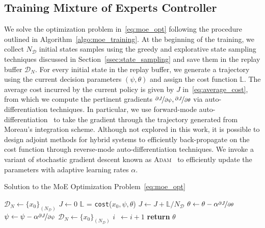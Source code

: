 \subsection{Training Mixture of Experts Controller}
\label{ssec:training_moe}

%
We solve the optimization problem in~\eqref{eq:moe_opt} following the procedure
outlined in Algorithm~\eqref{algo:moe_training}.
%
At the beginning of the training, we collect $N_{\mathcal{D}}$ initial states
samples using the greedy and explorative state sampling techniques discussed in
Section~\ref{ssec:state_sampling} and save them in the replay buffer $\mathcal{D}_N$.
%
For every initial state in the replay buffer, we generate a trajectory using the
current decision parameters $(\psi, \theta)$ and assign the cost function
$\mathbb{L}$.
%
The average cost incurred by the current policy is given by $J$
in~\eqref{eq:average_cost}, from which we compute the pertinent gradients
$\nicefrac{\partial J}{\partial \psi}, \nicefrac{\partial J}{\partial \theta}$
via auto-differentiation techniques.
%
In particular, we use forward-mode auto-differentiation~\cite{revels2016forward}
to take the gradient through the trajectory generated from Moreau's integration
scheme.
%
Although not explored in this work, it is possible to design adjoint methods for
hybrid systems to efficiently back-propagate on the cost function through
reverse-mode auto-differentiation techniques.
%
We invoke a variant of stochastic gradient descent known as
\textsc{Adam}~\cite{kingma2014adam} to efficiently update the parameters with
adaptive learning rates $\alpha$.
%
\begin{algorithm}[tb]
      \caption{Solution to the MoE Optimization Problem~\eqref{eq:moe_opt}}
      \label{algo:moe_training}
      \small
      \begin{algorithmic}[1]
          \algrenewcommand\algorithmicindent{0em} %
          \State $\mathcal{D}_N \gets \{x_0\}_{(N_{\mathcal{D}})}$   
          \algrenewcommand\algorithmicindent{1.1em} %
          \State $J \gets 0$
              \State $\mathbb{L}$ = \texttt{cost}($x_0, \psi, \theta$) 
              \State $J \gets J + \mathbb{L}/N_{\mathcal{D}}$ 
          \EndFor
          \State $\theta \gets \theta - \alpha \nicefrac{\partial J}{\partial \theta}$
          \State $\psi \gets \psi - \alpha \nicefrac{\partial J}{\partial \psi}$
          \State $\mathcal{D}_N \gets \{x_0\}_{(N_{\mathcal{D}})}$
          \State $i \;\:\gets i + 1$
          \EndWhile
          \State \textbf{return} $\theta$
      \end{algorithmic}
\end{algorithm}
%

